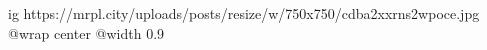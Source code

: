  
 
 
 
 

\ifcmt
  ig https://mrpl.city/uploads/posts/resize/w/750x750/cdba2xxrns2wpoce.jpg
  @wrap center
  @width 0.9
\fi
